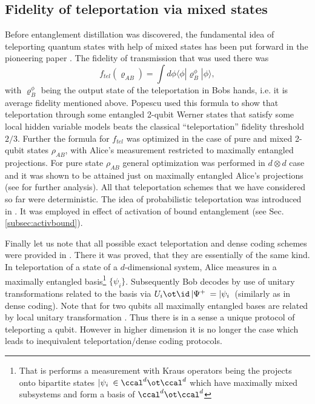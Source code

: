 \documentclass[twocolumn,aps,rmp]{revtex4}
\begin{document}
\subsection{Fidelity of teleportation via mixed states}
Before entanglement distillation was discovered,
the fundamental idea of teleporting quantum states with help of
mixed states has been put forward in the pioneering paper \cite{Popescu1}.
The fidelity of transmission that
was used there was
\begin{equation}
f_{tel}(\varrho_{AB})=\int d \phi \langle \phi|\varrho^{\phi}_{B}
|\phi \rangle,
\end{equation}
with $\varrho^{\phi}_{B}$ being the output state of the
teleportation in Bobs hands, i.e. it is average fidelity mentioned
above. Popescu used this formula to show that teleportation through
some entangled 2-qubit Werner states that satisfy some local hidden
variable models \cite{Werner1989} beats the classical
``teleportation'' fidelity threshold $2/3$. Further the formula for
$f_{tel}$ was optimized in the case of pure
\cite{GisinTeleportation} and mixed \cite{HHH1996-teleportation}
2-qubit states $\rho_{AB}$, with Alice's measurement restricted to
maximally entangled projections. For pure state $\rho_{AB}$ general
optimization was performed in $d \otimes d$ case and it was shown
to be attained just on maximally entangled Alice's projections
\cite{BanaszekTeleportation}(see \cite{BowenBoseTeleportation} for
further analysis). All that teleportation schemes that we have considered so far were deterministic. The idea of probabilistic teleportation was introduced in \cite{MorTelepovm,BrassardHorodeckiMorTeleportation}. It was employed in effect of activation of bound entanglement (see Sec. \ref{subsec:activbound}).

Finally let us note that all possible
exact teleportation and dense coding schemes were provided in
\cite{werner-alltel}. There it was proved, that they are essentially
of the same kind.  In teleportation of a state of a $d$-dimensional system, Alice measures in a maximally entangled basis\footnote{ That is performs a measurement with Kraus operators being the projects onto bipartite states $|\psi_i\>\in \ccal^d\ot\ccal^d$ which have maximally mixed subsystems and form a basis of $\ccal^d\ot\ccal^d$} $\{\psi_i\}$. Subsequently Bob decodes by use of unitary transformations related to the basis via $U_i\ot \id \, |\Psi^+\> =|\psi_i\>$ (similarly as in dense coding).
Note that for two qubits all maximally entangled bases are related by local unitary
transformation \cite{MRH-PRA96}. Thus there is in a sense a unique protocol
of teleporting a qubit.  However in higher dimension it is no longer the case  \cite{WojcikGC2003-Bell-bases} which leads to inequivalent teleportation/dense coding protocols.
\end{document}
